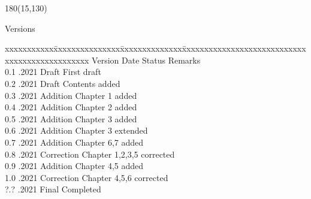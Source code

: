 
\begin{textblock}{180}(15,130)
\color{black}
\begin{huge}
Versions
\end{huge}
\vspace{5mm}

\fontsize{10pt}{18pt}\selectfont
\begin{tabbing}
xxxxxxxxxxx\=xxxxxxxxxxxxxxx\=xxxxxxxxxxxxxx\=xxxxxxxxxxxxxxxxxxxxxxxxxxxxxxxxxxxxxxxxxxxxxxx \kill
Version	\> Date	\> Status			\> Remarks		\\
0.1 .2021 \> Draft      \> First draft           \\
0.2 .2021 \> Draft      \> Contents added        \\
0.3 .2021 \> Addition   \> Chapter 1 added       \\
0.4 .2021 \> Addition   \> Chapter 2 added       \\
0.5 .2021 \> Addition   \> Chapter 3 added       \\
0.6 .2021 \> Addition   \> Chapter 3 extended    \\
0.7 .2021 \> Addition   \> Chapter 6,7 added       \\
0.8 .2021 \> Correction   \> Chapter 1,2,3,5 corrected       \\
0.9 .2021 \> Addition   \> Chapter 4,5 added       \\
1.0 .2021 \> Correction   \> Chapter 4,5,6 corrected       \\
?.? .2021 \> Final      \> Completed             \\
\end{tabbing}

\end{textblock}



